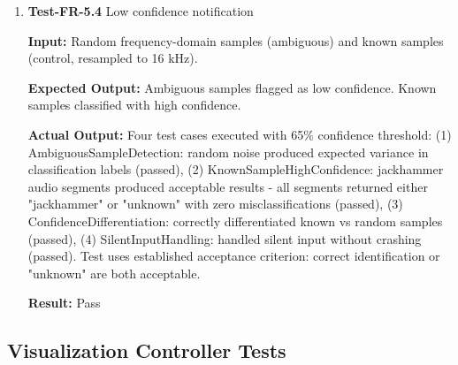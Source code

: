 \documentclass[12pt, titlepage]{article}
\begin{document}
\begin{enumerate}
\textbf{Input:}
Random frequency-domain samples (4-mic array).

\textbf{Expected Output:}
Estimated directions output in radians, within range [0, 2$\pi$].

\textbf{Actual Output:}
Three test cases passed: (1) gccPhatAngleRange verified output in [0, 2$\pi$]
range for random inputs, (2) NoDoAAlgo verified default angle = 0.0 when
algorithm disabled.

\textbf{Result:} Pass

\item{\textbf{Test-FR-5.4} Low confidence notification \\}

\textbf{Input:}
Random frequency-domain samples (ambiguous) and known samples (control,
resampled to 16 kHz).

\textbf{Expected Output:}
Ambiguous samples flagged as low confidence. Known samples classified with high
confidence.

\textbf{Actual Output:}
Four test cases executed with 65\% confidence threshold: (1)
AmbiguousSampleDetection: random noise produced expected variance in
classification labels (passed), (2) KnownSampleHighConfidence: jackhammer audio
segments produced acceptable results - all segments returned either "jackhammer"
or "unknown" with zero misclassifications (passed), (3)
ConfidenceDifferentiation: correctly differentiated known vs random samples
(passed), (4) SilentInputHandling: handled silent input without crashing
(passed). Test uses established acceptance criterion: correct identification or
"unknown" are both acceptable.

\textbf{Result:} Pass

\end{enumerate}

\subsection{Visualization Controller Tests}
\end{document}
